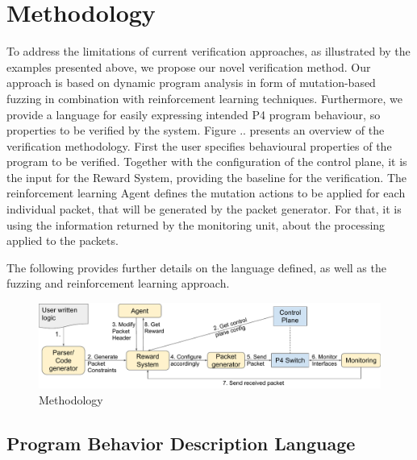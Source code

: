 \section{Methodology}

To address the limitations of current verification approaches, as illustrated by the examples presented above, we propose our novel verification method. Our approach is based on dynamic program analysis in form of mutation-based fuzzing in combination with reinforcement learning techniques. Furthermore, we provide a language for easily expressing intended P4 program behaviour, so properties to be verified by the system. Figure .. presents an overview of the verification methodology. First the user specifies behavioural properties of the program to be verified. Together with the configuration of the control plane, it is the input for the Reward System, providing the baseline for the verification. The reinforcement learning Agent defines the mutation actions to be applied for each individual packet, that will be generated by the packet generator. For that, it is using the information returned by the monitoring unit, about the processing applied to the packets.

The following provides further details on the language defined, as well as the fuzzing and reinforcement learning approach.

\begin{figure}
  \includegraphics[width=\textwidth]{figures/methodology_v4.pdf}
  \caption{Methodology  }
\end{figure}

\subsection{Program Behavior Description Language}

